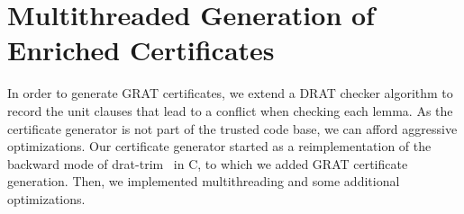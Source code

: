 \documentclass[smallcondensed]{svjour3}     %
\newcommand\CC{C\nolinebreak[4]\hspace{-.05em}\raisebox{.4ex}{\relsize{-3}{\textbf{++}}}}
\begin{document}
%     
%   
%   
%       
%       
%     
%     
    
\section{Multithreaded Generation of Enriched Certificates}\label{sec:gratgen}
In order to generate GRAT certificates, we extend a DRAT checker algorithm 
to record the unit clauses that lead to a conflict when checking each lemma. 
As the certificate generator is not part of the trusted code base, we can afford aggressive optimizations.
Our certificate generator started as a reimplementation of the backward mode of drat-trim~\cite{WHH13,drat-trim-webpage} in \CC, to 
which we added GRAT certificate generation. Then, we implemented multithreading and some additional optimizations.
\end{document}
